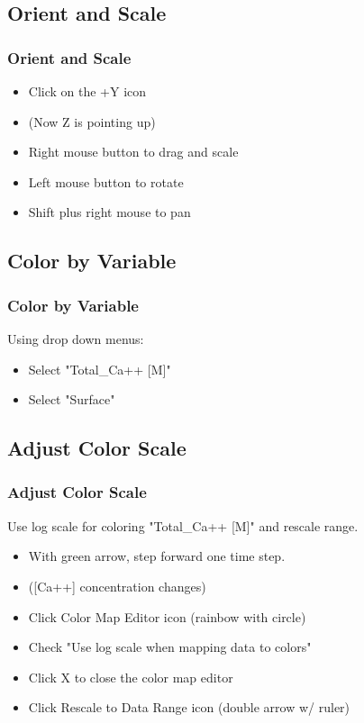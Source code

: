 \documentclass{beamer}
\begin{document}
\subsection{Orient and Scale}

\begin{frame}[fragile]\frametitle{Orient and Scale}

\begin{itemize}
  \item Click on the +Y icon
  \item (Now Z is pointing up)
  \item Right mouse button to drag and scale
  \item Left mouse button to rotate
  \item Shift plus right mouse to pan
\end{itemize}

\end{frame}

\subsection{Color by Variable}

\begin{frame}[fragile]\frametitle{Color by Variable}
Using drop down menus:
\begin{itemize}
  \item Select "Total\_Ca++ [M]"
  \item Select "Surface"
\end{itemize}

\end{frame}

\subsection{Adjust Color Scale}

\begin{frame}[fragile]\frametitle{Adjust Color Scale}
Use log scale for coloring "Total\_Ca++ [M]" and rescale range.

\begin{itemize}
  \item With green arrow, step forward one time step.
  \item ([Ca++] concentration changes)
  \item Click Color Map Editor icon (rainbow with circle)
  \item Check "Use log scale when mapping data to colors"
  \item Click X to close the color map editor
  \item Click Rescale to Data Range icon (double arrow w/ ruler)
\end{itemize}

\end{frame}
\end{document}

